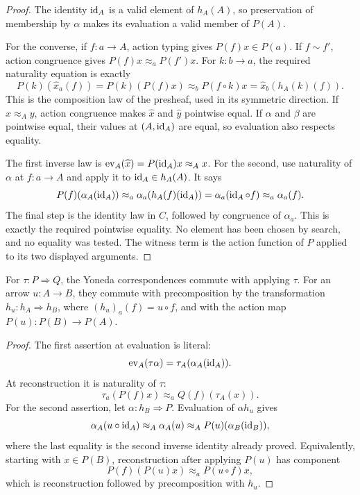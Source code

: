 \begin{proof}
The identity $\operatorname{id}_A$ is a valid element of $h_A(A)$, so preservation of
membership by $\alpha$ makes its evaluation a valid member of $P(A)$.

For the converse, if $f:a\to A$, action typing gives $P(f)x\in P(a)$.
If $f\sim f'$, action congruence gives $P(f)x\approx_a P(f')x$.
For $k:b\to a$, the required naturality equation is exactly
\[
 P(k)(\widehat{x}_a(f))
 =P(k)(P(f)x)
 \approx_b P(f\circ k)x
 =\widehat{x}_b(h_A(k)(f)).
\]
This is the composition law of the presheaf, used in its symmetric direction.
If $x\approx_A y$, action congruence makes $\widehat{x}$ and $\widehat{y}$
pointwise equal.  If $\alpha$ and $\beta$ are pointwise equal, their values
at $(A,\operatorname{id}_A)$ are equal, so evaluation also respects equality.

The first inverse law is
$\operatorname{ev}_A(\widehat{x})=P(\operatorname{id}_A)x\approx_A x$.
For the second, use naturality of $\alpha$ at $f:a\to A$ and apply it to
$\operatorname{id}_A\in h_A(A)$.  It says
\[
 P(f)(\alpha_A(\operatorname{id}_A))
 \approx_a\alpha_a(h_A(f)(\operatorname{id}_A))
 =\alpha_a(\operatorname{id}_A\circ f)
 \approx_a\alpha_a(f).
\]
The final step is the identity law in $C$, followed by congruence of
$\alpha_a$.  This is exactly the required pointwise equality.  No element
has been chosen by search, and no equality was tested.  The witness term
is the action function of $P$ applied to its two displayed arguments.
\end{proof}

\begin{proposition}
For $\tau:P\Rightarrow Q$, the Yoneda correspondences commute with applying
$\tau$.  For an arrow $u:A\to B$, they commute with precomposition by the
transformation $h_u:h_A\Rightarrow h_B$, where
$(h_u)_a(f)=u\circ f$, and with the action map $P(u):P(B)\to P(A)$.
\end{proposition}
\begin{proof}
The first assertion at evaluation is literal:
\[
 \operatorname{ev}_A(\tau\alpha)
 =\tau_A(\alpha_A(\operatorname{id}_A)).
\]
At reconstruction it is naturality of $\tau$:
\[
 \tau_a(P(f)x)\approx_a Q(f)(\tau_A(x)).
\]
For the second assertion, let $\alpha:h_B\Rightarrow P$.  Evaluation of
$\alpha h_u$ gives
\[
 \alpha_A(u\circ\operatorname{id}_A)\approx_A\alpha_A(u)
 \approx_A P(u)(\alpha_B(\operatorname{id}_B)),
\]
where the last equality is the second inverse identity already proved.
Equivalently, starting with $x\in P(B)$, reconstruction after applying $P(u)$
has component
\[
 P(f)(P(u)x)\approx_a P(u\circ f)x,
\]
which is reconstruction followed by precomposition with $h_u$.
\end{proof}

